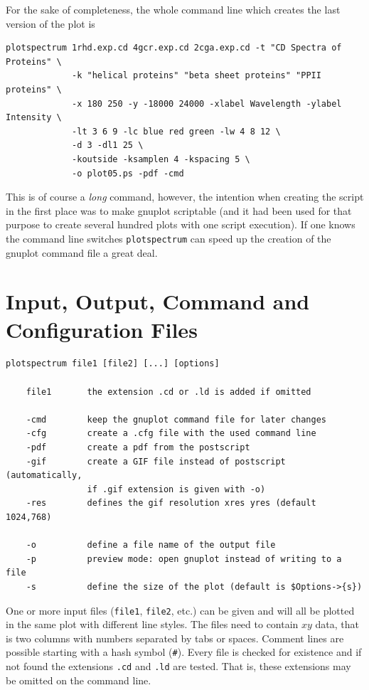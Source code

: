 \documentclass[12pt, a4paper]{article}
\begin{document}
For the sake of completeness, the whole command line which creates the last version of the plot is

\begin{verbatim}
plotspectrum 1rhd.exp.cd 4gcr.exp.cd 2cga.exp.cd -t "CD Spectra of Proteins" \
             -k "helical proteins" "beta sheet proteins" "PPII proteins" \
             -x 180 250 -y -18000 24000 -xlabel Wavelength -ylabel Intensity \
             -lt 3 6 9 -lc blue red green -lw 4 8 12 \
             -d 3 -dl1 25 \
             -koutside -ksamplen 4 -kspacing 5 \
             -o plot05.ps -pdf -cmd
\end{verbatim}

This is of course a \emph{long} command, however, the intention when creating the script in the first place was to make gnuplot scriptable (and it had been used for that purpose to create several hundred plots with one script execution). If one knows the command line switches \verb'plotspectrum' can speed up the creation of the gnuplot command file a great deal.




\section{Input, Output, Command and Configuration Files}

\begin{verbatim}
plotspectrum file1 [file2] [...] [options]

    file1       the extension .cd or .ld is added if omitted 
 
    -cmd        keep the gnuplot command file for later changes 
    -cfg        create a .cfg file with the used command line
    -pdf        create a pdf from the postscript 
    -gif        create a GIF file instead of postscript (automatically,
                if .gif extension is given with -o)
    -res        defines the gif resolution xres yres (default 1024,768) 
 
    -o          define a file name of the output file 
    -p          preview mode: open gnuplot instead of writing to a file 
    -s          define the size of the plot (default is $Options->{s}) 
\end{verbatim}

One or more input files (\texttt{file1}, \texttt{file2}, etc.) can be given and will all be plotted in the same plot with different line styles. The files need to contain $xy$ data, that is two columns with numbers separated by tabs or spaces. Comment lines are possible starting with a hash symbol (\verb'#'). Every file is checked for existence and if not found the extensions \verb'.cd' and \verb'.ld' are tested. That is, these extensions may be omitted on the command line.
\end{document}

